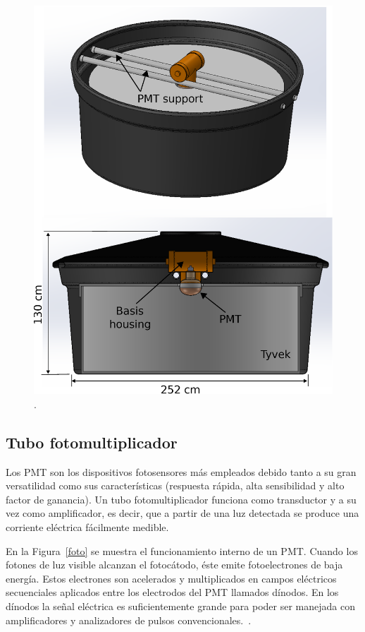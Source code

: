 \begin{figure}[H]
\includegraphics[scale=0.4]{Figs/Tank.eps} 
\centering
\caption[Ilustración de un Detector Cherenkov]{.~\citep{hernandez2018procedimiento}}
\label{tank}
\end{figure}

\subsection{Tubo fotomultiplicador}
Los PMT son los dispositivos fotosensores más empleados debido tanto a su gran versatilidad como sus características (respuesta rápida, alta sensibilidad y alto factor de ganancia).
Un tubo fotomultiplicador funciona como transductor y a su vez como amplificador, es decir, que a partir de una luz detectada se produce una corriente eléctrica fácilmente medible.

En la Figura~\ref{foto} se muestra el funcionamiento interno de un PMT.
Cuando los fotones de luz visible alcanzan el fotocátodo, éste emite fotoelectrones de baja energía.
Estos electrones son acelerados y multiplicados en campos eléctricos secuenciales aplicados entre los electrodos del PMT llamados dínodos.
En los dínodos la señal eléctrica es suficientemente grande para poder ser manejada con amplificadores y analizadores de pulsos convencionales.~\citep{kaptanoglu2018characterization}.


